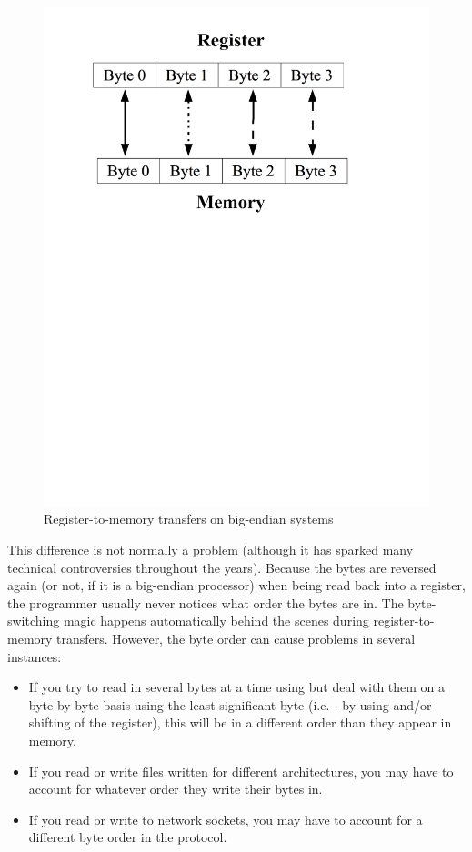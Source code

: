 \begin{figure}
\caption{Register-to-memory transfers on big-endian systems}
\includegraphics[width=\textwidth]{bigendian.png}
\end{figure}

This difference is not normally a problem (although it has sparked many
technical controversies throughout the years). 
Because the bytes are reversed again (or not, if it is a big-endian processor)
when being read back into a register, the programmer usually never 
notices what order the bytes are in.  The byte-switching magic happens
automatically behind the scenes during register-to-memory transfers.  
However, the byte order can cause problems in several instances:

\begin{itemize}\item If you try to read in several bytes at a time using  but deal with them on a byte-by-byte basis using the least significant byte (i.e. - by using {\alReg} and/or shifting of the register), this will be in a different order than they appear in memory. 
\item If you read or write files written for different architectures, you may have to account for whatever order they write their bytes in. 
\item If you read or write to network sockets, you may have to account for a different byte order in the protocol. 
\end{itemize}

